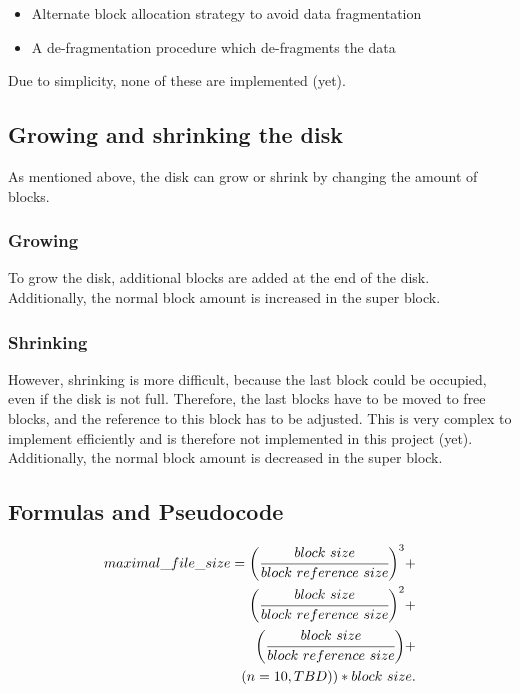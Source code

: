 \documentclass[JCDReport.tex]{subfiles}
\begin{document}
\begin{itemize}
  \item Alternate block allocation strategy to avoid data fragmentation
  \item A de-fragmentation procedure which de-fragments the data
\end{itemize}

Due to simplicity, none of these are implemented (yet).

\subsection{Growing and shrinking the disk}

As mentioned above, the disk can grow or shrink by changing the amount of blocks.

\subsubsection{Growing}

To grow the disk, additional blocks are added at the end of the disk. Additionally, the normal block amount is increased in the super block.

\subsubsection{Shrinking}

However, shrinking is more difficult, because the last block could be occupied, even if the disk is not full. Therefore, the last blocks have to be moved to free blocks, and the reference to this block has to be adjusted. This is very complex to implement efficiently and is therefore not implemented in this project (yet).\\
Additionally, the normal block amount is decreased in the super block.

\subsection{Formulas and Pseudocode}

\begin{equation}
\begin{split}
maximal\_file\_size =
  \bigg(\cfrac{block\ size}{block\ reference\ size}\bigg)^3 +\\
  \bigg(\cfrac{block\ size}{block\ reference\ size}\bigg)^2 +\\
  \bigg(\cfrac{block\ size}{block\ reference\ size}\bigg) +\\
  (n=10, TBD)) * block\ size.
\end{split}
\end{equation}
\end{document}

